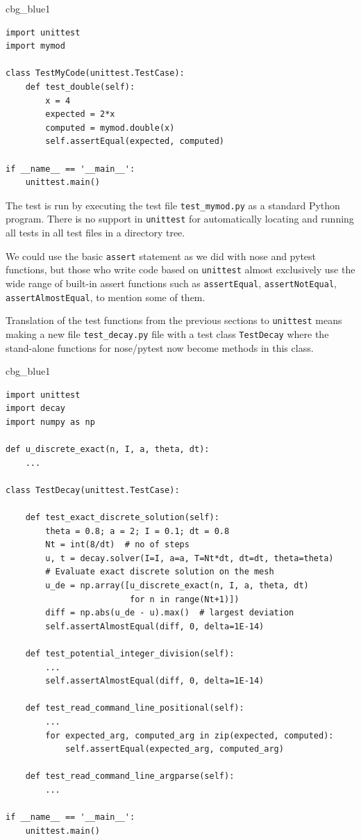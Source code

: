 \documentclass[%
oneside,                 %
final,                   %
10pt]{article}
\newenvironment{_cod_tight}[1]{
   \def\FrameCommand{\colorbox{#1}}
   \FrameRule0.6pt\MakeFramed {\FrameRestore}\vskip3mm}
   {\vskip0mm\endMakeFramed}
\newenvironment{cod}[1]{
\bgroup\rmfamily
\fboxsep=0mm\relax
\begin{_cod_tight}{#1}
\list{}{\parsep=-2mm\parskip=0mm\topsep=0pt\leftmargin=2mm
\rightmargin=2\leftmargin\leftmargin=4pt\relax}
\item\relax}
{\endlist\end{_cod_tight}\egroup}
\begin{document}
\begin{cod}{cbg_blue1}\begin{Verbatim}[numbers=none,fontsize=\fontsize{9pt}{9pt},baselinestretch=0.95,xleftmargin=2mm]
import unittest
import mymod

class TestMyCode(unittest.TestCase):
    def test_double(self):
        x = 4
        expected = 2*x
        computed = mymod.double(x)
        self.assertEqual(expected, computed)

if __name__ == '__main__':
    unittest.main()
\end{Verbatim}
\end{cod}
\noindent
The test is run by executing the test file \Verb!test_mymod.py! as a standard
Python program. There is no support in \texttt{unittest} for automatically
locating and running all tests in all test files in a directory tree.

We could use the basic \texttt{assert} statement as we did with nose and pytest
functions, but those who write code based on \texttt{unittest} almost
exclusively use the wide range of built-in assert functions such
as \texttt{assertEqual}, \texttt{assertNotEqual}, \texttt{assertAlmostEqual}, to mention
some of them.

Translation of the test functions from the previous sections
to \texttt{unittest} means making a new file \Verb!test_decay.py! file with a
test class \texttt{TestDecay} where the stand-alone functions for
nose/pytest now become methods in this class.

\begin{cod}{cbg_blue1}\begin{Verbatim}[numbers=none,fontsize=\fontsize{9pt}{9pt},baselinestretch=0.95,xleftmargin=2mm]
import unittest
import decay
import numpy as np

def u_discrete_exact(n, I, a, theta, dt):
    ...

class TestDecay(unittest.TestCase):

    def test_exact_discrete_solution(self):
        theta = 0.8; a = 2; I = 0.1; dt = 0.8
        Nt = int(8/dt)  # no of steps
        u, t = decay.solver(I=I, a=a, T=Nt*dt, dt=dt, theta=theta)
        # Evaluate exact discrete solution on the mesh
        u_de = np.array([u_discrete_exact(n, I, a, theta, dt)
                         for n in range(Nt+1)])
        diff = np.abs(u_de - u).max()  # largest deviation
        self.assertAlmostEqual(diff, 0, delta=1E-14)

    def test_potential_integer_division(self):
        ...
        self.assertAlmostEqual(diff, 0, delta=1E-14)

    def test_read_command_line_positional(self):
        ...
        for expected_arg, computed_arg in zip(expected, computed):
            self.assertEqual(expected_arg, computed_arg)

    def test_read_command_line_argparse(self):
        ...

if __name__ == '__main__':
    unittest.main()
\end{Verbatim}
\end{cod}
\noindent
\end{document}
